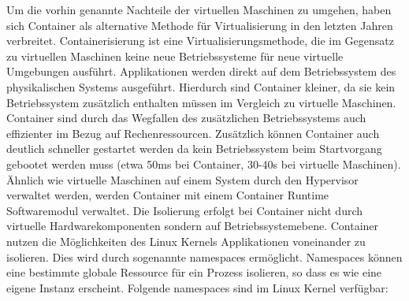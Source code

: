Um die vorhin genannte Nachteile der virtuellen Maschinen zu umgehen, haben sich Container als alternative Methode für Virtualisierung in den letzten Jahren verbreitet. Containerisierung ist eine Virtualisierungsmethode, die im Gegensatz zu virtuellen Maschinen keine neue Betriebssysteme für neue virtuelle Umgebungen ausführt. Applikationen werden direkt auf dem Betriebssystem des physikalischen Systems ausgeführt.  Hierdurch sind Container kleiner, da sie kein Betriebssystem zusätzlich enthalten müssen im Vergleich zu virtuelle Maschinen. Container sind durch das Wegfallen des zusätzlichen Betriebssystems auch effizienter im Bezug auf Rechenressourcen. Zusätzlich können Container auch deutlich schneller gestartet werden da kein Betriebssystem beim Startvorgang gebootet werden muss (etwa 50ms bei Container, 30-40s bei virtuelle Maschinen). \cite{Martin2018} Ähnlich wie virtuelle Maschinen auf einem System durch den Hypervisor verwaltet werden, werden Container mit einem Container Runtime Softwaremodul verwaltet. Die Isolierung erfolgt bei Container nicht durch virtuelle Hardwarekomponenten sondern auf Betriebssystemebene. Container nutzen die Möglichkeiten des Linux Kernels Applikationen voneinander zu isolieren. Dies wird durch sogenannte namespaces ermöglicht. Namespaces können eine bestimmte globale Ressource für ein Prozess isolieren, so dass es wie eine eigene Instanz erscheint. Folgende namespaces sind im Linux Kernel verfügbar:
